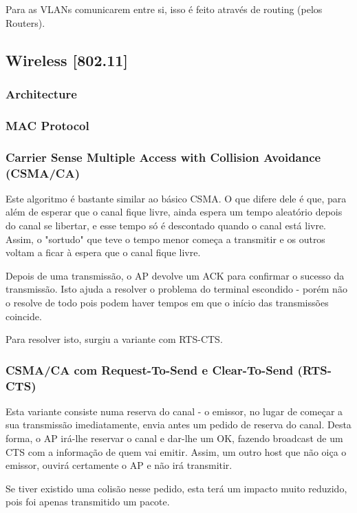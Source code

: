 \documentclass[12pt]{article}
\begin{document}
Para as VLANs comunicarem entre si, isso é feito através de routing (pelos Routers).

\subsection{Wireless [802.11]}

\subsubsection{Architecture}

\subsubsection{MAC Protocol}

\subsubsection*{Carrier Sense Multiple Access with Collision Avoidance (CSMA/CA)}

Este algoritmo é bastante similar ao básico CSMA. O que difere dele é que, para além de esperar que o canal fique livre, ainda espera um tempo aleatório depois do canal se libertar, e esse tempo só é descontado quando o canal está livre.
Assim, o "sortudo" que teve o tempo menor começa a transmitir e os outros voltam a ficar à espera que o canal fique livre.

Depois de uma transmissão, o AP devolve um ACK para confirmar o sucesso da transmissão. Isto ajuda a resolver o problema do terminal escondido - porém não o resolve de todo pois podem haver tempos em que o início das transmissões coincide.

Para resolver isto, surgiu a variante com RTS-CTS.

\subsubsection*{CSMA/CA com Request-To-Send e Clear-To-Send (RTS-CTS)}

Esta variante consiste numa reserva do canal - o emissor, no lugar de começar a sua transmissão imediatamente, envia antes um pedido de reserva do canal.
Desta forma, o AP irá-lhe reservar o canal e dar-lhe um OK, fazendo broadcast de um CTS com a informação de quem vai emitir.
Assim, um outro host que não oiça o emissor, ouvirá certamente o AP e não irá transmitir.

Se tiver existido uma colisão nesse pedido, esta terá um impacto muito reduzido, pois foi apenas transmitido um pacote.
\end{document}
